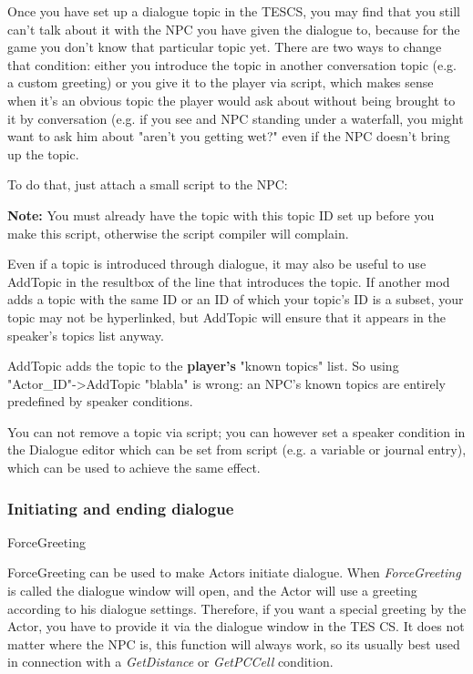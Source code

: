 \documentclass[
]{article}
\begin{document}
Once you have set up a dialogue topic in the TESCS, you may find that
you still can't talk about it with the NPC you have given the dialogue
to, because for the game you don't know that particular topic yet. There
are two ways to change that condition: either you introduce the topic in
another conversation topic (e.g. a custom greeting) or you give it to
the player via script, which makes sense when it's an obvious topic the
player would ask about without being brought to it by conversation (e.g.
if you see and NPC standing under a waterfall, you might want to ask him
about "aren't you getting wet?" even if the NPC doesn't bring up the
topic.

To do that, just attach a small script to the NPC:



\textbf{Note:} You must already have the topic with this topic ID set up
before you make this script, otherwise the script compiler will
complain.

Even if a topic is introduced through dialogue, it may also be useful to
use AddTopic in the resultbox of the line that introduces the topic. If
another mod adds a topic with the same ID or an ID of which your topic's
ID is a subset, your topic may not be hyperlinked, but AddTopic will
ensure that it appears in the speaker's topics list anyway.

AddTopic adds the topic to the \textbf{player's} "known topics" list. So
using\\
"Actor\_ID"-\textgreater AddTopic "blabla" is wrong: an NPC's known
topics are entirely predefined by speaker conditions.

You can not remove a topic via script; you can however set a speaker
condition in the Dialogue editor which can be set from script (e.g. a
variable or journal entry), which can be used to achieve the same
effect.

\hypertarget{initiating-and-ending-dialogue}{%
\subsubsection{Initiating and ending
dialogue}\label{initiating-and-ending-dialogue}}

ForceGreeting

ForceGreeting can be used to make Actors initiate dialogue. When
\emph{ForceGreeting} is called the dialogue window will open, and the
Actor will use a greeting according to his dialogue settings. Therefore,
if you want a special greeting by the Actor, you have to provide it via
the dialogue window in the TES CS. It does not matter where the NPC is,
this function will always work, so its usually best used in connection
with a \emph{GetDistance} or \emph{GetPCCell} condition.
\end{document}
